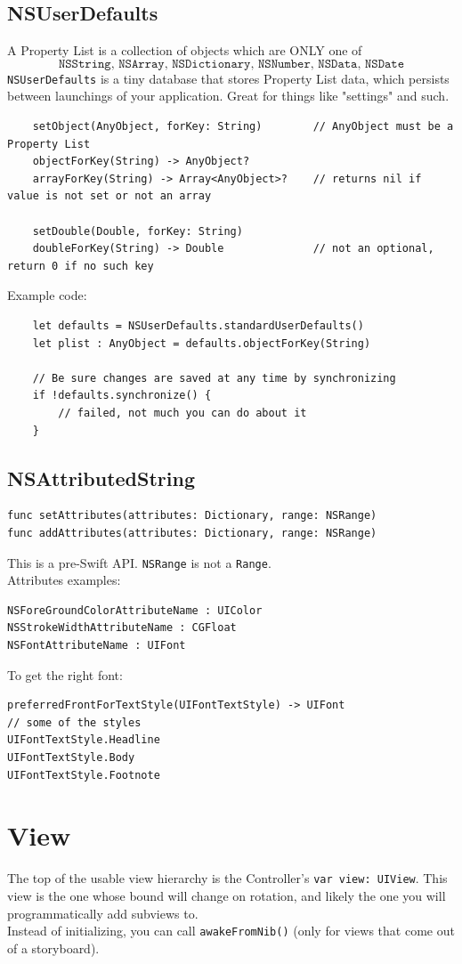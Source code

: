 \documentclass[12pt]{report}
\newcommand{\co}{\texttt}
\begin{document}
\section{NSUserDefaults}
A Property List is a collection of objects which are ONLY one of $$\co{NSString, NSArray, NSDictionary, NSNumber, NSData, NSDate}$$
\co{NSUserDefaults} is a tiny database that stores Property List data, which persists between launchings of your application. Great for things like "settings" and such.
\begin{lstlisting}
	setObject(AnyObject, forKey: String)		// AnyObject must be a Property List
	objectForKey(String) -> AnyObject?
	arrayForKey(String) -> Array<AnyObject>?	// returns nil if value is not set or not an array

	setDouble(Double, forKey: String)
	doubleForKey(String) -> Double 				// not an optional, return 0 if no such key
\end{lstlisting}
Example code:
\begin{lstlisting}
	let defaults = NSUserDefaults.standardUserDefaults()
	let plist : AnyObject = defaults.objectForKey(String)

	// Be sure changes are saved at any time by synchronizing
	if !defaults.synchronize() {
		// failed, not much you can do about it
	}

\end{lstlisting}

\section{NSAttributedString}
\begin{lstlisting}
func setAttributes(attributes: Dictionary, range: NSRange)
func addAttributes(attributes: Dictionary, range: NSRange)
\end{lstlisting}
This is a pre-Swift API. \co{NSRange} is not a \co{Range}.\\
Attributes examples:
\begin{lstlisting}
NSForeGroundColorAttributeName : UIColor
NSStrokeWidthAttributeName : CGFloat
NSFontAttributeName : UIFont
\end{lstlisting}
To get the right font:
\begin{lstlisting}
preferredFrontForTextStyle(UIFontTextStyle) -> UIFont
// some of the styles
UIFontTextStyle.Headline
UIFontTextStyle.Body
UIFontTextStyle.Footnote
\end{lstlisting}



\chapter{View}
The top of the usable view hierarchy is the Controller's \co{var view: UIView}. This view is the one whose bound will change on rotation, and likely the one you will programmatically add subviews to.\\
Instead of initializing, you can call \co{awakeFromNib()} (only for views that come out of a storyboard).\\
\end{document}
